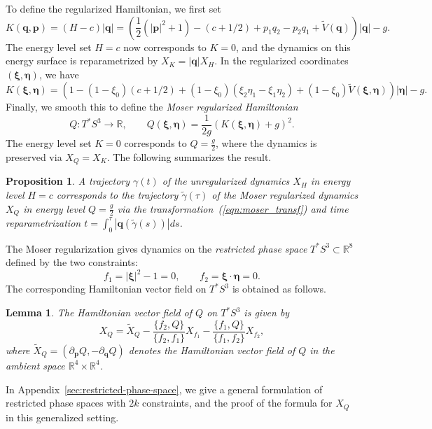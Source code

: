 \documentclass[pdflatex,sn-mathphys-ay]{sn-jnl}%
\theoremstyle{thmstyleone}%
\newtheorem{proposition}[theorem]{Proposition}%
\newtheorem{lemma}[theorem]{Lemma}%
\theoremstyle{thmstyletwo}%
\theoremstyle{thmstylethree}%
\begin{document}
To define the regularized Hamiltonian, we first set
\begin{equation*}
    K(\mathbf{q},\mathbf{p}) = (H - c)|\mathbf{q}| = \left( \frac{1}{2}(|\mathbf{p}|^2 + 1) - (c + 1/2) + p_1q_2 - p_2q_1 + \tilde{V}(\mathbf{q}) \right)|\mathbf{q}| - g.
\end{equation*}
The energy level set $H=c$ now corresponds to $K=0$, and the dynamics on this energy surface is reparametrized by $X_K = |\mathbf{q}|X_H$. In the regularized coordinates $(\boldsymbol{\xi}, \boldsymbol{\eta})$, we have
\[
    K(\boldsymbol{\xi}, \boldsymbol{\eta}) = \left(
        1 - (1 - \xi_0)(c + 1/2) + (1 - \xi_0)(\xi_2\eta_1 - \xi_1\eta_2) + (1 - \xi_0)\tilde{V}(\boldsymbol{\xi}, \boldsymbol{\eta})
    \right)|\boldsymbol{\eta}| - g.
\]
Finally, we smooth this to define the \emph{Moser regularized Hamiltonian}
\[
    Q:T^*S^3\to \mathbb{R},\qquad Q(\boldsymbol{\xi}, \boldsymbol{\eta}) = \frac{1}{2g}(K(\boldsymbol{\xi}, \boldsymbol{\eta}) + g)^2.
\]
The energy level set $K=0$ corresponds to $Q=\frac{g}{2}$, where the dynamics is preserved via $X_Q = X_K$. The following summarizes the result.
\begin{proposition}
    A trajectory $\gamma(t)$ of the unregularized dynamics $X_H$ in energy level $H=c$ corresponds to the trajectory $\tilde{\gamma}(\tau)$ of the Moser regularized dynamics $X_Q$ in energy level $Q=\frac{g}{2}$ via the transformation~(\ref{eqn:moser_transf}) and time reparametrization $t=\int_0^\tau |\mathbf{q}(\tilde{\gamma}(s))| ds$.
\end{proposition}

The Moser regularization gives dynamics on the \emph{restricted phase space} $T^*S^3\subset\mathbb{R}^8$ defined by the two constraints:
\[
    f_1 = |\boldsymbol{\xi}|^2 - 1 = 0, \qquad f_2 = \boldsymbol{\xi}\cdot \boldsymbol{\eta} = 0.
\]
The corresponding Hamiltonian vector field on $T^*S^3$ is obtained as follows.
\begin{lemma}
    \label{lem:restricted_ham_vf_two}
The Hamiltonian vector field of $Q$ on $T^*S^3$ is given by
\[
X_Q = \tilde{X}_Q - \frac{\{ f_2, Q \}}{\{ f_2, f_1 \}} X_{f_1} - \frac{\{ f_1, Q \}}{\{ f_1, f_2 \}} X_{f_2},
\]
where $\tilde{X}_Q = (\partial_{\mathbf{p}} Q, -\partial_{\mathbf{q}} Q)$ denotes the Hamiltonian vector field of $Q$ in the ambient space $\mathbb{R}^4\times \mathbb{R}^4$.
\end{lemma}
In Appendix~\ref{sec:restricted-phase-space}, we give a general formulation of restricted phase spaces with $2k$ constraints, and the proof of the formula for $X_Q$ in this generalized setting.
\end{document}
